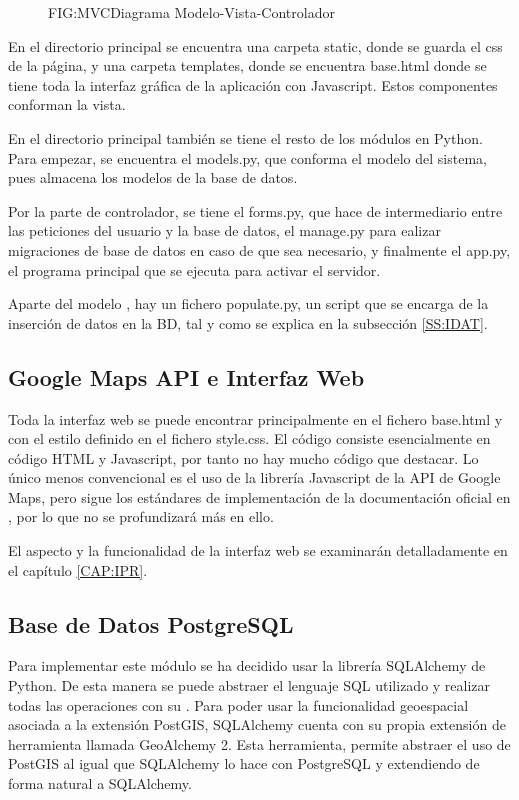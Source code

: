       \begin{figure}[Diagrama Modelo-Vista-Controlador]{FIG:MVC}{Diagrama Modelo-Vista-Controlador}
      \end{figure}
      
      En el directorio principal se encuentra una carpeta static, donde se guarda el css de la página, y una carpeta templates, donde se encuentra  base.html donde se tiene toda la interfaz gráfica de la aplicación con Javascript. Estos componentes conforman la vista. 
       
      En el directorio principal también se tiene el resto de los módulos en Python. Para empezar, se encuentra el models.py, que conforma el modelo del sistema, pues almacena los modelos de la base de datos.
      
      Por la parte de controlador, se tiene el forms.py, que hace de intermediario entre las peticiones del usuario y la base de datos, el manage.py para ealizar migraciones de base de datos en caso de que sea necesario, y finalmente el app.py, el programa principal que se ejecuta para activar el servidor.
      
      Aparte del modelo , hay un fichero populate.py, un script que se encarga de la inserción de datos en la BD, tal y como se explica en la subsección \ref{SS:IDAT}.
      
      
    \subsection{Google Maps API e Interfaz Web}
      Toda la interfaz web se puede encontrar principalmente en el fichero base.html y con el estilo definido en el fichero style.css. El código consiste esencialmente en código HTML y Javascript, por tanto no hay mucho código que destacar. Lo único menos convencional es el uso de la  librería Javascript de la API de Google Maps, pero sigue los estándares de implementación de la documentación oficial en \cite{gmaps}, por lo que no se profundizará más en ello.
      
      El aspecto y la funcionalidad de la interfaz web se examinarán detalladamente en el capítulo \ref{CAP:IPR}.
      
      
    \subsection{Base de Datos PostgreSQL}
      Para implementar este módulo se ha decidido usar la librería SQLAlchemy\cite{sqlalchemy} de Python. De esta manera se puede abstraer el lenguaje SQL utilizado y realizar todas las operaciones con su . 
      Para poder usar la funcionalidad geoespacial asociada a la extensión PostGIS, SQLAlchemy cuenta con su propia extensión de herramienta llamada GeoAlchemy 2\cite{geoalchemy}. Esta herramienta, permite abstraer el uso de PostGIS al igual que SQLAlchemy lo hace con PostgreSQL y extendiendo de forma natural a SQLAlchemy.
      
